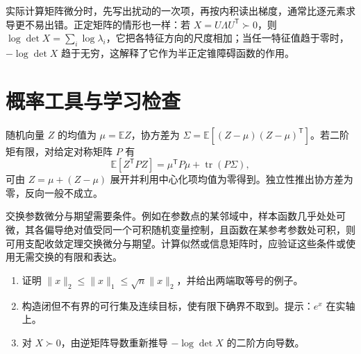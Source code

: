 实际计算矩阵微分时，先写出扰动的一次项，再按内积读出梯度，通常比逐元素求导更不易出错。正定矩阵的情形也一样：若 $X=U\Lambda U^{\mathsf T}\succ0$，则 $\log\det X=\sum_i\log\lambda_i$，它把各特征方向的尺度相加；当任一特征值趋于零时，$-\log\det X$ 趋于无穷，这解释了它作为半正定锥障碍函数的作用。

\section{概率工具与学习检查}

随机向量 $Z$ 的均值为 $\mu=\mathbb EZ$，协方差为 $\Sigma=\mathbb E[(Z-\mu)(Z-\mu)^{\mathsf T}]$。若二阶矩有限，对给定对称矩阵 $P$ 有
\[
 \mathbb E[Z^{\mathsf T}PZ]=\mu^{\mathsf T}P\mu+\operatorname{tr}(P\Sigma),
\]
可由 $Z=\mu+(Z-\mu)$ 展开并利用中心化项均值为零得到。独立性推出协方差为零，反向一般不成立。

交换参数微分与期望需要条件。例如在参数点的某邻域中，样本函数几乎处处可微，其各偏导绝对值受同一个可积随机变量控制，且函数在某参考参数处可积，则可用支配收敛定理交换微分与期望。计算似然或信息矩阵时，应验证这些条件或使用无需交换的有限和表达。

\begin{enumerate}
 \item 证明 $\|x\|_2\leq\|x\|_1\leq\sqrt n\|x\|_2$，并给出两端取等号的例子。
 \item 构造闭但不有界的可行集及连续目标，使有限下确界不取到。提示：$e^x$ 在实轴上。
 \item 对 $X\succ0$，由逆矩阵导数重新推导 $-\log\det X$ 的二阶方向导数。
\end{enumerate}

